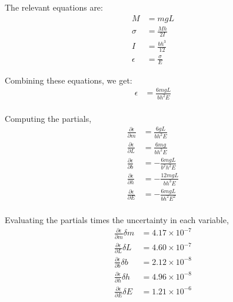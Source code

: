 \section{}

The relevant equations are:
\begin{align*}
    M &= mgL \\
    \sigma &= \frac{Mh}{2I} \\
    I &= \frac{bh^3}{12} \\
    \epsilon &= \frac{\sigma}{E}
\end{align*}

Combining these equations, we get:
\begin{align*}
    \epsilon &= \frac{6mgL}{b h^2 E} \\
\end{align*}

Computing the partials,
\begin{align*}
    \frac{\partial \epsilon}{\partial m} &= \frac{6gL}{b h^2 E} \\
    \frac{\partial \epsilon}{\partial L} &= \frac{6mg}{b h^2 E} \\
    \frac{\partial \epsilon}{\partial b} &= -\frac{6mgL}{b^2 h^2 E} \\
    \frac{\partial \epsilon}{\partial h} &= -\frac{12mgL}{b h^3 E} \\
    \frac{\partial \epsilon}{\partial E} &= -\frac{6mgL}{b h^2 E^2} \\
\end{align*}

Evaluating the partials times the uncertainty in each variable,
\begin{align*}
    \frac{\partial \epsilon}{\partial m} \delta m &=  4.17 \times 10^{-7} \\
    \frac{\partial \epsilon}{\partial L} \delta L &=  4.60 \times 10^{-7} \\
    \frac{\partial \epsilon}{\partial b} \delta b &=  2.12 \times 10^{-8} \\
    \frac{\partial \epsilon}{\partial h} \delta h &=  4.96 \times 10^{-8} \\
    \frac{\partial \epsilon}{\partial E} \delta E &=  1.21 \times 10^{-6} \\
\end{align*}

